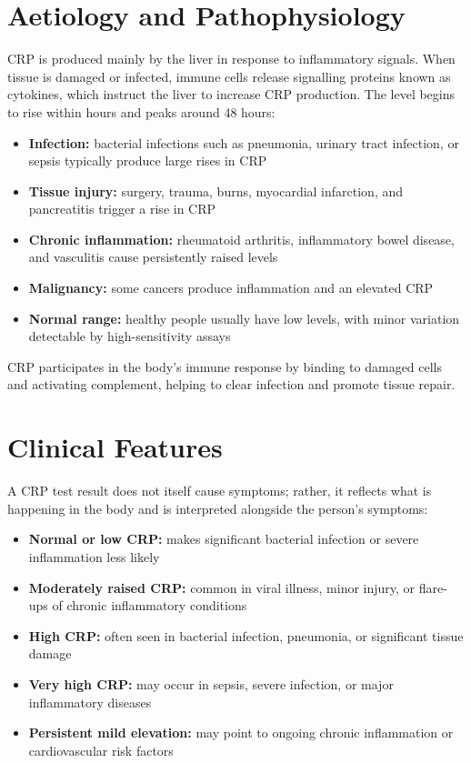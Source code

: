 \section*{Aetiology and Pathophysiology}
CRP is produced mainly by the liver in response to inflammatory signals. When tissue is damaged or infected, immune cells release signalling proteins known as cytokines, which instruct the liver to increase CRP production. The level begins to rise within hours and peaks around 48 hours:
\begin{itemize}
    \item \textbf{Infection:} bacterial infections such as pneumonia, urinary tract infection, or sepsis typically produce large rises in CRP
    \item \textbf{Tissue injury:} surgery, trauma, burns, myocardial infarction, and pancreatitis trigger a rise in CRP
    \item \textbf{Chronic inflammation:} rheumatoid arthritis, inflammatory bowel disease, and vasculitis cause persistently raised levels
    \item \textbf{Malignancy:} some cancers produce inflammation and an elevated CRP
    \item \textbf{Normal range:} healthy people usually have low levels, with minor variation detectable by high-sensitivity assays
\end{itemize}

CRP participates in the body's immune response by binding to damaged cells and activating complement, helping to clear infection and promote tissue repair.

\section*{Clinical Features}
A CRP test result does not itself cause symptoms; rather, it reflects what is happening in the body and is interpreted alongside the person's symptoms:
\begin{itemize}
    \item \textbf{Normal or low CRP:} makes significant bacterial infection or severe inflammation less likely
    \item \textbf{Moderately raised CRP:} common in viral illness, minor injury, or flare-ups of chronic inflammatory conditions
    \item \textbf{High CRP:} often seen in bacterial infection, pneumonia, or significant tissue damage
    \item \textbf{Very high CRP:} may occur in sepsis, severe infection, or major inflammatory diseases
    \item \textbf{Persistent mild elevation:} may point to ongoing chronic inflammation or cardiovascular risk factors
\end{itemize}

